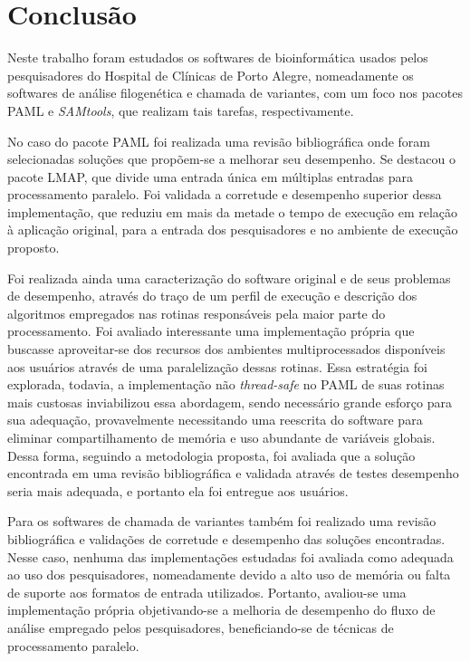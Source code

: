 \documentclass[cic,tc]{iiufrgs}
\begin{document}
%
%
%
%
\chapter{Conclusão}
\label{chap:conc}

Neste trabalho foram estudados os softwares de bioinformática usados pelos
pesquisadores do Hospital de Clínicas de Porto Alegre, nomeadamente os
softwares de análise filogenética e chamada de variantes, com um foco nos
pacotes PAML e \textit{SAMtools}, que realizam tais tarefas, respectivamente.

No caso do pacote PAML foi realizada uma revisão bibliográfica onde foram
selecionadas soluções que propõem-se a melhorar seu desempenho. Se destacou o
pacote LMAP, que divide uma entrada única em múltiplas entradas para
processamento paralelo. Foi validada a corretude e desempenho superior dessa
implementação, que reduziu em mais da metade o tempo de execução em relação à
aplicação original, para a entrada dos pesquisadores e no ambiente de execução
proposto.

Foi realizada ainda uma caracterização do software original e de seus problemas
de desempenho, através do traço de um perfil de execução e descrição dos
algoritmos empregados nas rotinas responsáveis pela maior parte do
processamento. Foi avaliado interessante uma implementação própria que buscasse
aproveitar-se dos recursos dos ambientes multiprocessados disponíveis aos
usuários através de uma paralelização dessas rotinas. Essa estratégia foi
explorada, todavia, a implementação não \textit{thread-safe} no PAML de suas
rotinas mais custosas inviabilizou essa abordagem, sendo necessário grande
esforço para sua adequação, provavelmente necessitando uma reescrita do
software para eliminar compartilhamento de memória e uso abundante de variáveis
globais. Dessa forma, seguindo a metodologia proposta, foi avaliada que a
solução encontrada em uma revisão bibliográfica e validada através de testes
desempenho seria mais adequada, e portanto ela foi entregue aos usuários.

Para os softwares de chamada de variantes também foi realizado uma revisão
bibliográfica e validações de corretude e desempenho das soluções encontradas.
Nesse caso, nenhuma das implementações estudadas foi avaliada como adequada ao
uso dos pesquisadores, nomeadamente devido a alto uso de memória ou falta de
suporte aos formatos de entrada utilizados. Portanto, avaliou-se uma
implementação própria objetivando-se a melhoria de desempenho do fluxo de
análise empregado pelos pesquisadores, beneficiando-se de técnicas de
processamento paralelo.
\end{document}

